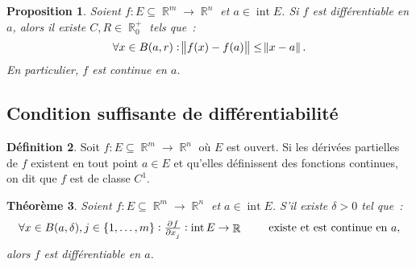 \documentclass{article}
\DeclareMathOperator{\intr}{int}
\DeclareMathOperator{\R}{\mathbb R}
\newcommand{\frmrn}[2]{#1 : #2 \subseteq \R^m \to \R^n}
\newtheorem{thm}{Théorème}[section]
\newtheorem{prp}[thm]{Proposition}
\theoremstyle{definition}
\newtheorem{déf}[thm]{Définition}
\theoremstyle{remark}
\begin{document}
		\begin{prp}\label{prp:diffexistanceC} Soient $\frmrn fE$ et $a \in \intr E$. Si $f$ est différentiable en $a$, alors il existe $C, R \in  \R_0^+$ tels
		que~:
		\[\forall x \in B(a, r) : \norm{f(x)-f(a)} \leq \norm{x-a}.\]
		En particulier, $f$ est continue en $a$.
		\end{prp}

	\subsection{Condition suffisante de différentiabilité}
		\begin{déf} Soit $\frmrn fE$ où $E$ est ouvert. Si les dérivées partielles de $f$ existent en tout point $a \in E$ et qu'elles définissent des fonctions
		continues, on dit que $f$ est de classe $C^1$.
		\end{déf}

		\begin{thm}\label{thm:diffssipdcont} Soient $\frmrn fE$ et $a \in \intr E$. S'il existe $\delta > 0$ tel que~:
		\[\forall x \in B(a, \delta), j \in \{1, \dotsc, m\} : \pd f{x_j} : \intr E \to \R\qquad\text{ existe et est continue en $a$},\]
		alors $f$ est différentiable en $a$.
		\end{thm}
\end{document}

